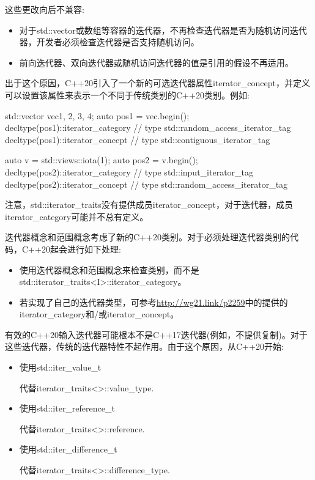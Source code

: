 这些更改向后不兼容:

\begin{itemize}
\item
对于std::vector或数组等容器的迭代器，不再检查迭代器是否为随机访问迭代器，开发者必须检查迭代器是否支持随机访问。

\item
前向迭代器、双向迭代器或随机访问迭代器的值是引用的假设不再适用。
\end{itemize}

出于这个原因，C++20引入了一个新的可选迭代器属性iterator\_concept，并定义可以设置该属性来表示一个不同于传统类别的C++20类别。例如:

\begin{cpp}
std::vector vec{1, 2, 3, 4};
auto pos1 = vec.begin();
decltype(pos1)::iterator_category // type std::random_access_iterator_tag
decltype(pos1)::iterator_concept // type std::contiguous_iterator_tag

auto v = std::views::iota(1);
auto pos2 = v.begin();
decltype(pos2)::iterator_category // type std::input_iterator_tag
decltype(pos2)::iterator_concept // type std::random_access_iterator_tag
\end{cpp}

注意，std::iterator\_traits没有提供成员iterator\_concept，对于迭代器，成员iterator\_category可能并不总有定义。

迭代器概念和范围概念考虑了新的C++20类别。对于必须处理迭代器类别的代码，C++20起会进行如下处理:

\begin{itemize}
\item
使用迭代器概念和范围概念来检查类别，而不是std::iterator\_traits<I>::iterator\_category。

\item
若实现了自己的迭代器类型，可参考\url{http://wg21.link/p2259}中的提供的iterator\_category和/或iterator\_concept。
\end{itemize}

有效的C++20输入迭代器可能根本不是C++17迭代器(例如，不提供复制)。对于这些迭代器，传统的迭代器特性不起作用。由于这个原因，从C++20开始:

\begin{itemize}
\item
使用std::iter\_value\_t

代替iterator\_traits<>::value\_type.

\item
使用std::iter\_reference\_t

代替iterator\_traits<>::reference.

\item
使用std::iter\_difference\_t

代替iterator\_traits<>::difference\_type.
\end{itemize}





















